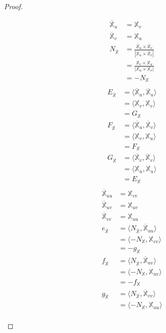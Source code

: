 \documentclass[10pt,a4paper]{article}
\begin{document}
\begin{proof}
\begin{enumerate}
\begin{align*}
\overline{\mathbb{X}}_u&=\mathbb{X}_v\\
\overline{\mathbb{X}}_v&=\mathbb{X}_u\\
N_{\overline{\mathbb{X}}}&=\frac{\overline{\mathbb{X}}_u\times\overline{\mathbb{X}}_v}{|\overline{\mathbb{X}}_u\times\overline{\mathbb{X}}_v|}\\
&=\frac{\mathbb{X}_v\times\mathbb{X}_u}{|\mathbb{X}_u\times\mathbb{X}_v|}\\
&=-N_{\mathbb{X}}\\
\end{align*}
\begin{align*}
E_{\overline{\mathbb{X}}} &= \langle \overline{\mathbb{X}}_u, \overline{\mathbb{X}}_u\rangle\\
&= \langle \mathbb{X}_v, \mathbb{X}_v\rangle\\
&= G_{\mathbb{X}}\\
F_{\overline{\mathbb{X}}} &= \langle \overline{\mathbb{X}}_u, \overline{\mathbb{X}}_v\rangle\\
&= \langle \mathbb{X}_v, \mathbb{X}_u\rangle\\
&= F_{\mathbb{X}}\\
G_{\overline{\mathbb{X}}} &= \langle \overline{\mathbb{X}}_v, \overline{\mathbb{X}}_v\rangle\\
&= \langle \mathbb{X}_u, \mathbb{X}_u\rangle\\
&= E_{\mathbb{X}}\\
\end{align*}
\begin{align*}
\overline{\mathbb{X}}_{uu}&=\mathbb{X}_{vv}\\
\overline{\mathbb{X}}_{uv}&=\mathbb{X}_{uv}\\
\overline{\mathbb{X}}_{vv}&=\mathbb{X}_{uu}\\
e_{\overline{\mathbb{X}}} &= \langle N_{\overline{\mathbb{X}}}, \overline{\mathbb{X}}_{uu}\rangle\\
&= \langle -N_{\mathbb{X}}, \mathbb{X}_{vv}\rangle\\
&= -g_{\mathbb{X}}\\
f_{\overline{\mathbb{X}}} &= \langle N_{\overline{\mathbb{X}}}, \overline{\mathbb{X}}_{uv}\rangle\\
&= \langle -N_{\mathbb{X}}, \mathbb{X}_{uv}\rangle\\
&= -f_{\mathbb{X}}\\
g_{\overline{\mathbb{X}}} &= \langle N_{\overline{\mathbb{X}}}, \overline{\mathbb{X}}_{vv}\rangle\\
&= \langle -N_{\mathbb{X}}, \mathbb{X}_{uu}\rangle\\

\end{align*}
\end{enumerate}
\end{proof}
\end{document}
